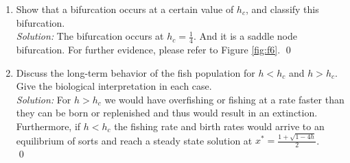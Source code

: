 \documentclass[10pt]{amsart}
\theoremstyle{nonumberplain}
\begin{document}
\begin{enumerate}[label={\bf {\arabic*}:}]
\begin{enumerate}
\item Show that a bifurcation occurs at a certain value of $h_c$, and classify this bifurcation. \\

\noindent
\textit{Solution:} The bifurcation occurs at $h_c = \frac 1 4$.
And it is a saddle node bifurcation.
For further evidence, please refer to Figure \ref{fig:f6}.
\qed \\

\item Discuss the long-term behavior of the fish population for $h < h_c$ and $h > h_c$. 
Give the biological interpretation in each case. \\

\noindent
\textit{Solution:} 
For $h > h_c$ we would have overfishing or fishing at a rate faster than they can be born or replenished and thus would result in an extinction.
Furthermore, if $h < h_c$ the fishing rate and birth rates would arrive to an equilibrium of sorts and reach a steady state solution at $x^* = \frac {1 + \sqrt{1 - 4h}}{2}$. \\
\qed \\

\end{enumerate}

\end{enumerate}
\end{document}
